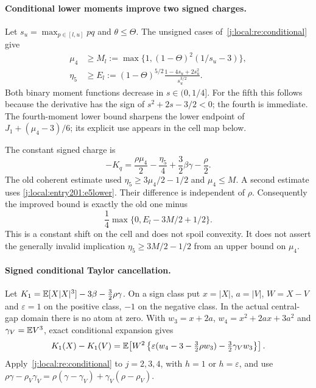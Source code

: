 \paragraph{Conditional lower moments improve two signed charges.}

Let $s_u=\max_{p\in[l,u]}pq$ and $\theta\le\Theta$.
The unsigned cases of~\eqref{j:local:re:conditional} give
\begin{align}
 \mu_4&\ge M_l:=\max\{1,(1-\Theta)^2(1/s_u-3)\},\label{j:local:entry201:m4lower}\\
 \eta_5&\ge E_l:=
 (1-\Theta)^{5/2}\frac{1-4s_u+2s_u^2}{s_u^{3/2}}.\label{j:local:entry201:e5lower}
\end{align}
Both binary moment functions decrease in $s\in(0,1/4]$.
For the fifth this follows because the derivative has the sign of
$s^2+2s-3/2<0$; the fourth is immediate.
The fourth-moment lower bound sharpens the lower endpoint of
$J_1+(\mu_4-3)/6$; its explicit use appears in the cell map below.

The constant signed charge is
\[
 -K_q=\frac{\rho\mu_4}{2}-\frac{\eta_5}{4}
       +\frac32\beta\gamma-\frac{\rho}{2}.
\]
The old coherent estimate used $\eta_5\ge3\mu_4/2-1/2$ and
$\mu_4\le M$. A second estimate uses \eqref{j:local:entry201:e5lower}.
Their difference is independent of $\rho$. Consequently the improved
bound is exactly the old one minus
\begin{equation}\label{j:local:entry201:eta-improvement}
 \frac14\max\{0,E_l-3M/2+1/2\}.
\end{equation}
This is a constant shift on the cell and does not spoil convexity.
It does not assert the generally invalid implication
$\eta_5\ge3M/2-1/2$ from an upper bound on $\mu_4$.

\paragraph{Signed conditional Taylor cancellation.}

Let $K_1=\mathbb E[X|X|^3]-3\beta-\tfrac32\rho\gamma$.
On a sign class put $x=|X|$, $a=|V|$, $W=X-V$ and
$\varepsilon=1$ on the positive class, $-1$ on the negative class.
In the actual central-gap domain there is no atom at zero.
With $w_3=x+2a$, $w_4=x^2+2ax+3a^2$ and
$\gamma_V=\mathbb E V^3$, exact conditional expansion gives
\begin{equation}\label{j:local:entry201:Kexact}
 K_1(X)-K_1(V)
 =\mathbb E\!\left[W^2
 \left\{\varepsilon(w_4-3-\tfrac32\rho w_3)
                   -\tfrac32\gamma_Vw_3\right\}\right].
\end{equation}
Apply~\eqref{j:local:re:conditional} to $j=2,3,4$, with $h=1$
or $h=\varepsilon$, and use
$\rho\gamma-\rho_V\gamma_V
=\rho(\gamma-\gamma_V)+\gamma_V(\rho-\rho_V)$.

